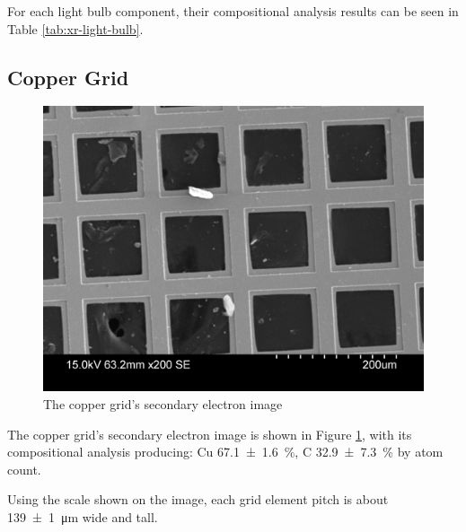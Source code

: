 \documentclass[a4paper]{scrartcl}
\begin{document}
For each light bulb component, their compositional analysis results can be seen in Table \ref{tab:xr-light-bulb}.

\subsection{Copper Grid}
\begin{figure}
    \centering
    \includegraphics[width = 15cm]{measurements/SE-copper-grid.png}
    \caption{The copper grid's secondary electron image}
    \label{fig:se-copper-grid}
\end{figure}

The copper grid's secondary electron image is shown in Figure \ref{fig:se-copper-grid}, with its compositional analysis producing: Cu \SI{67.1 \pm 1.6}{\percent}, C \SI{32.9 \pm 7.3}{\percent} by atom count.

Using the scale shown on the image, each grid element pitch is about \SI{139 \pm 1}{\micro\metre} wide and tall.
\end{document}
